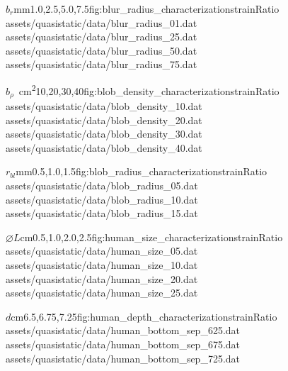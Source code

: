 \begin{multicols*}{2}
			\characterizationDataTable%
				{$b_r$}{mm}{1.0,2.5,5.0,7.5}{fig:blur_radius_characterization}{strainRatio}%
				{assets/quasistatic/data/blur_radius_01.dat}%
				{assets/quasistatic/data/blur_radius_25.dat}%
				{assets/quasistatic/data/blur_radius_50.dat}%
				{assets/quasistatic/data/blur_radius_75.dat}

			\characterizationDataTable%
				{$b_\rho$}{\si{\per\cm\squared}}{10,20,30,40}{fig:blob_density_characterization}{strainRatio}%
				{assets/quasistatic/data/blob_density_10.dat}%
				{assets/quasistatic/data/blob_density_20.dat}%
				{assets/quasistatic/data/blob_density_30.dat}%
				{assets/quasistatic/data/blob_density_40.dat}

			\characterizationDataTable%
				{$r_{bl}$}{mm}{0.5,1.0,1.5}{fig:blob_radius_characterization}{strainRatio}%
				{assets/quasistatic/data/blob_radius_05.dat}%
				{assets/quasistatic/data/blob_radius_10.dat}%
				{assets/quasistatic/data/blob_radius_15.dat}%
				{}

			\characterizationDataTable%
				{$\diameter L$}{cm}{0.5,1.0,2.0,2.5}{fig:human_size_characterization}{strainRatio}%
				{assets/quasistatic/data/human_size_05.dat}%
				{assets/quasistatic/data/human_size_10.dat}%
				{assets/quasistatic/data/human_size_20.dat}%
				{assets/quasistatic/data/human_size_25.dat}

			\characterizationDataTable%
				{$d$}{cm}{6.5,6.75,7.25}{fig:human_depth_characterization}{strainRatio}%
				{assets/quasistatic/data/human_bottom_sep_625.dat}%
				{assets/quasistatic/data/human_bottom_sep_675.dat}%
				{assets/quasistatic/data/human_bottom_sep_725.dat}%
				{}
		\end{multicols*}

